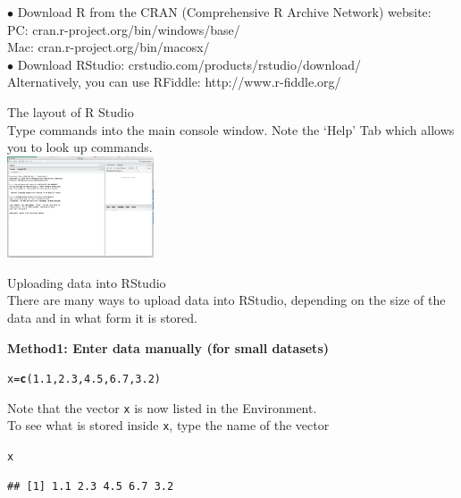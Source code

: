 \documentclass[bigtut]{tutorial}\usepackage[]{graphicx}\usepackage[]{color}
\makeatletter
\newcommand{\hlnum}[1]{\textcolor[rgb]{0.686,0.059,0.569}{#1}}%
\newcommand{\hlstd}[1]{\textcolor[rgb]{0.345,0.345,0.345}{#1}}%
\newcommand{\hlkwb}[1]{\textcolor[rgb]{0.69,0.353,0.396}{#1}}%
\newcommand{\hlkwd}[1]{\textcolor[rgb]{0.737,0.353,0.396}{\textbf{#1}}}%
\newenvironment{kframe}{%
 \def\at@end@of@kframe{}%
 \ifinner\ifhmode%
  \def\at@end@of@kframe{\end{minipage}}%
  \begin{minipage}{\columnwidth}%
 \fi\fi%
 \def\FrameCommand##1{\hskip\@totalleftmargin \hskip-\fboxsep
 \colorbox{shadecolor}{##1}\hskip-\fboxsep
     \hskip-\linewidth \hskip-\@totalleftmargin \hskip\columnwidth}%
 \MakeFramed {\advance\hsize-\width
   \@totalleftmargin\z@ \linewidth\hsize
   \@setminipage}}%
 {\par\unskip\endMakeFramed%
 \at@end@of@kframe}
\newenvironment{knitrout}{}{} %
\makeatother
\begin{document}
\begin{tutorial}
\begin{questions}
$\bullet$ Download R from the CRAN
(Comprehensive R Archive Network) website:  \\
PC: cran.r-project.org/bin/windows/base/ \\
Mac: cran.r-project.org/bin/macosx/ \\

$\bullet$ Download RStudio: crstudio.com/products/rstudio/download/  \\

Alternatively, you can use RFiddle: http://www.r-fiddle.org/ 

\newpage
\question The layout of R Studio \\

Type commands into the main console window.
Note the `Help' Tab which allows you to look up commands. \\

\includegraphics[height=3cm]{RStudioLayout.jpg}

\question Uploading data into RStudio \\

There are many ways to upload data into RStudio, depending on the size of the data and in what form it is stored.

\vspace{1cm}
{\bf Method1: Enter data manually (for small datasets)}

\begin{knitrout}
\color{fgcolor}\begin{kframe}
\begin{alltt}
\hlstd{x}\hlkwb{=}\hlkwd{c}\hlstd{(}\hlnum{1.1}\hlstd{,}\hlnum{2.3}\hlstd{,}\hlnum{4.5}\hlstd{,}\hlnum{6.7}\hlstd{,}\hlnum{3.2}\hlstd{)}
\end{alltt}
\end{kframe}
\end{knitrout}

Note that the vector \texttt{x} is now listed in the Environment. \\

To see what is stored inside \texttt{x}, type the name of the vector
\begin{knitrout}
\color{fgcolor}\begin{kframe}
\begin{alltt}
\hlstd{x}
\end{alltt}
\begin{verbatim}
## [1] 1.1 2.3 4.5 6.7 3.2
\end{verbatim}
\end{kframe}
\end{knitrout}


\end{questions}
\end{tutorial}
\end{document}

